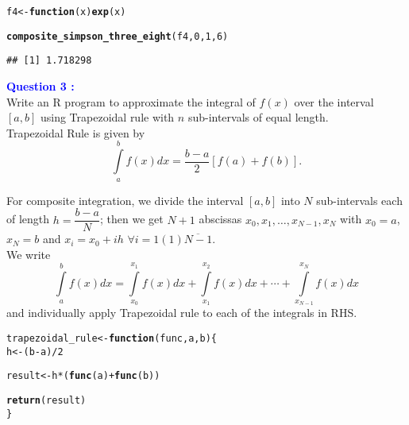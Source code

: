 \documentclass[11pt, a4paper]{article}\usepackage[]{graphicx}\usepackage[]{xcolor}
\makeatletter
\newcommand{\hlnum}[1]{\textcolor[rgb]{0.686,0.059,0.569}{#1}}%
\newcommand{\hlopt}[1]{\textcolor[rgb]{0,0,0}{#1}}%
\newcommand{\hldef}[1]{\textcolor[rgb]{0.345,0.345,0.345}{#1}}%
\newcommand{\hlkwa}[1]{\textcolor[rgb]{0.161,0.373,0.58}{\textbf{#1}}}%
\newcommand{\hlkwb}[1]{\textcolor[rgb]{0.69,0.353,0.396}{#1}}%
\newcommand{\hlkwc}[1]{\textcolor[rgb]{0.333,0.667,0.333}{#1}}%
\newcommand{\hlkwd}[1]{\textcolor[rgb]{0.737,0.353,0.396}{\textbf{#1}}}%
\newenvironment{kframe}{%
 \def\at@end@of@kframe{}%
 \ifinner\ifhmode%
  \def\at@end@of@kframe{\end{minipage}}%
  \begin{minipage}{\columnwidth}%
 \fi\fi%
 \def\FrameCommand##1{\hskip\@totalleftmargin \hskip-\fboxsep
 \colorbox{shadecolor}{##1}\hskip-\fboxsep
     \hskip-\linewidth \hskip-\@totalleftmargin \hskip\columnwidth}%
 \MakeFramed {\advance\hsize-\width
   \@totalleftmargin\z@ \linewidth\hsize
   \@setminipage}}%
 {\par\unskip\endMakeFramed%
 \at@end@of@kframe}
\newenvironment{knitrout}{}{} %
\makeatother
\begin{document}
\begin{knitrout}
\color{fgcolor}\begin{kframe}
\begin{alltt}
\hldef{f4} \hlkwb{<-} \hlkwa{function}\hldef{(}\hlkwc{x}\hldef{)} \hlkwd{exp}\hldef{(x)}

\hlkwd{composite_simpson_three_eight}\hldef{(f4,} \hlnum{0}\hldef{,} \hlnum{1}\hldef{,} \hlnum{6}\hldef{)}
\end{alltt}
\begin{verbatim}
## [1] 1.718298
\end{verbatim}
\end{kframe}
\end{knitrout}

\smallpencil \hspace{0.2cm} \textcolor{blue}{\textbf{Question 3 : }} \\

\hspace{1cm} Write an R program to approximate the integral of $f(x)$ over the interval $[a, b]$ using Trapezoidal rule with $n$ sub-intervals of equal length. \\

\faArrowAltCircleRight[regular] \hspace{0.2cm} Trapezoidal Rule is given by $$\int \limits_{a}^{b} f(x) dx = \dfrac{b-a}{2} \left[ f(a) + f(b) \right].$$

For composite integration, we divide the interval $[a, b]$ into $N$ sub-intervals each of length $h = \dfrac{b-a}{N}$; then we get $N + 1$ abscissas $x_0, x_1, \ldots, x_{N-1}, x_{N}$ with $x_0 = a$, $x_{N} = b$ and $x_i = x_0 + ih \,\, \forall i = 1(1)\overline{N-1}$. \\

We write $$\int \limits_{a}^{b} f(x) dx = \int \limits_{x_0}^{x_1} f(x) dx + \int \limits_{x_1}^{x_2} f(x) dx + \cdots + \int \limits_{x_{N-1}}^{x_{N}} f(x) dx$$ and individually apply Trapezoidal rule to each of the integrals in RHS.

\begin{knitrout}
\color{fgcolor}\begin{kframe}
\begin{alltt}
\hldef{trapezoidal_rule} \hlkwb{<-} \hlkwa{function}\hldef{(}\hlkwc{func}\hldef{,} \hlkwc{a}\hldef{,} \hlkwc{b}\hldef{)\{}
  \hldef{h} \hlkwb{<-} \hldef{(b} \hlopt{-} \hldef{a)} \hlopt{/} \hlnum{2}

  \hldef{result} \hlkwb{<-} \hldef{h} \hlopt{*} \hldef{(} \hlkwd{func}\hldef{(a)} \hlopt{+} \hlkwd{func}\hldef{(b))}

  \hlkwd{return}\hldef{(result)}
\hldef{\}}
\end{alltt}
\end{kframe}
\end{knitrout}
\end{document}
